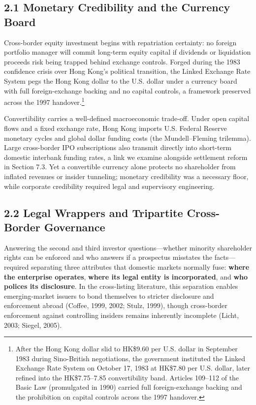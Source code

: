 \documentclass[11pt,letterpaper]{article}
\begin{document}
\subsection*{\texorpdfstring{2.1 Monetary Credibility and the Currency Board}{2.1 Monetary Credibility and the Currency Board}}
Cross-border equity investment begins with repatriation certainty: no foreign portfolio manager will commit long-term equity capital if dividends or liquidation proceeds risk being trapped behind exchange controls. Forged during the 1983 confidence crisis over Hong Kong's political transition, the Linked Exchange Rate System pegs the Hong Kong dollar to the U.S. dollar under a currency board with full foreign-exchange backing and no capital controls, a framework preserved across the 1997 handover.\footnote{After the Hong Kong dollar slid to HK\$9.60 per U.S. dollar in September 1983 during Sino-British negotiations, the government instituted the Linked Exchange Rate System on October 17, 1983 at HK\$7.80 per U.S. dollar, later refined into the HK\$7.75–7.85 convertibility band. Articles 109–112 of the Basic Law (promulgated in 1990) carried full foreign-exchange backing and the prohibition on capital controls across the 1997 handover.}

Convertibility carries a well-defined macroeconomic trade-off. Under open capital flows and a fixed exchange rate, Hong Kong imports U.S. Federal Reserve monetary cycles and global dollar funding costs (the Mundell–Fleming trilemma). Large cross-border IPO subscriptions also transmit directly into short-term domestic interbank funding rates, a link we examine alongside settlement reform in Section 7.3. Yet a convertible currency alone protects no shareholder from inflated revenues or insider tunneling; monetary credibility was a necessary floor, while corporate credibility required legal and supervisory engineering.

\subsection*{\texorpdfstring{2.2 Legal Wrappers and Tripartite Cross-Border Governance}{2.2 Legal Wrappers and Tripartite Cross-Border Governance}}
Answering the second and third investor questions—whether minority shareholder rights can be enforced and who answers if a prospectus misstates the facts—required separating three attributes that domestic markets normally fuse: \textbf{where the enterprise operates}, \textbf{where its legal entity is incorporated}, and \textbf{who polices its disclosure}. In the cross-listing literature, this separation enables emerging-market issuers to bond themselves to stricter disclosure and enforcement abroad (Coffee, 1999, 2002; Stulz, 1999), though cross-border enforcement against controlling insiders remains inherently incomplete (Licht, 2003; Siegel, 2005).
\end{document}
